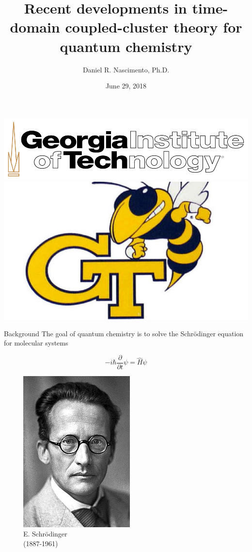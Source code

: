 \documentclass{beamer}
\title[Time-domain coupled-cluster theory]{Recent developments in time-domain coupled-cluster theory for quantum chemistry}
\author{Daniel R. Nascimento, Ph.D.}
\institute{Georgia Institute of Technology}
\date{June 29, 2018}
\begin{document}
\begin{frame}
 \includegraphics[scale=0.1]{figures/Gatech2.png}
 \hspace{155pt}
 \includegraphics[scale=0.1]{figures/Gatech1.jpg}
 \titlepage
\end{frame}


\begin{frame}{Background}
The goal of quantum chemistry is to solve the Schr{\"o}dinger equation for molecular systems
\begin{multicols}{2}
\begin{equation}
 -i \hbar \frac{\partial}{\partial t} \psi = \hat{H} \psi \nonumber
\end{equation}
\begin{figure}
 \includegraphics[scale=0.3]{figures/Schrodinger.jpg}\\
 E. Schr{\"o}dinger \\ (1887-1961)
\end{figure}
\end{multicols}
\end{frame}
\end{document}
